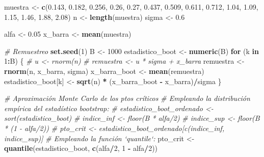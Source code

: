\documentclass[
]{book}
\newenvironment{Shaded}{\begin{snugshade}}{\end{snugshade}}
\newcommand{\CommentTok}[1]{\textcolor[rgb]{0.56,0.35,0.01}{\textit{#1}}}
\newcommand{\ControlFlowTok}[1]{\textcolor[rgb]{0.13,0.29,0.53}{\textbf{#1}}}
\newcommand{\DecValTok}[1]{\textcolor[rgb]{0.00,0.00,0.81}{#1}}
\newcommand{\FloatTok}[1]{\textcolor[rgb]{0.00,0.00,0.81}{#1}}
\newcommand{\KeywordTok}[1]{\textcolor[rgb]{0.13,0.29,0.53}{\textbf{#1}}}
\newcommand{\NormalTok}[1]{#1}
\newcommand{\OperatorTok}[1]{\textcolor[rgb]{0.81,0.36,0.00}{\textbf{#1}}}
\newcommand{\StringTok}[1]{\textcolor[rgb]{0.31,0.60,0.02}{#1}}
\theoremstyle{break}
\theoremstyle{definition}
\theoremstyle{definition}
\theoremstyle{definition}
\theoremstyle{remark}
\begin{document}
\begin{Shaded}
\begin{Highlighting}[]
\NormalTok{muestra <-}\StringTok{ }\KeywordTok{c}\NormalTok{(}\FloatTok{0.143}\NormalTok{, }\FloatTok{0.182}\NormalTok{, }\FloatTok{0.256}\NormalTok{, }\FloatTok{0.26}\NormalTok{, }\FloatTok{0.27}\NormalTok{, }\FloatTok{0.437}\NormalTok{, }\FloatTok{0.509}\NormalTok{, }
             \FloatTok{0.611}\NormalTok{, }\FloatTok{0.712}\NormalTok{, }\FloatTok{1.04}\NormalTok{, }\FloatTok{1.09}\NormalTok{, }\FloatTok{1.15}\NormalTok{, }\FloatTok{1.46}\NormalTok{, }\FloatTok{1.88}\NormalTok{, }\FloatTok{2.08}\NormalTok{)}
\NormalTok{n <-}\StringTok{ }\KeywordTok{length}\NormalTok{(muestra)}
\NormalTok{sigma <-}\StringTok{ }\FloatTok{0.6}

\NormalTok{alfa <-}\StringTok{ }\FloatTok{0.05}
\NormalTok{x_barra <-}\StringTok{ }\KeywordTok{mean}\NormalTok{(muestra)}

\CommentTok{# Remuestreo}
\KeywordTok{set.seed}\NormalTok{(}\DecValTok{1}\NormalTok{)}
\NormalTok{B <-}\StringTok{ }\DecValTok{1000}
\NormalTok{estadistico_boot <-}\StringTok{ }\KeywordTok{numeric}\NormalTok{(B)}
\ControlFlowTok{for}\NormalTok{ (k }\ControlFlowTok{in} \DecValTok{1}\OperatorTok{:}\NormalTok{B) \{}
    \CommentTok{# u <- rnorm(n)}
    \CommentTok{# remuestra <- u * sigma + x_barra}
\NormalTok{    remuestra <-}\StringTok{ }\KeywordTok{rnorm}\NormalTok{(n, x_barra, sigma)}
\NormalTok{    x_barra_boot <-}\StringTok{ }\KeywordTok{mean}\NormalTok{(remuestra)}
\NormalTok{    estadistico_boot[k] <-}\StringTok{ }\KeywordTok{sqrt}\NormalTok{(n) }\OperatorTok{*}\StringTok{ }\NormalTok{(x_barra_boot }\OperatorTok{-}\StringTok{ }\NormalTok{x_barra)}\OperatorTok{/}\NormalTok{sigma}
\NormalTok{\}}

\CommentTok{# Aproximación Monte Carlo de los ptos críticos}
\CommentTok{# Empleando la distribución empírica del estadístico bootstrap: }
    \CommentTok{# estadistico_boot_ordenado <- sort(estadistico_boot)}
    \CommentTok{# indice_inf <- floor(B * alfa/2)}
    \CommentTok{# indice_sup <- floor(B * (1 - alfa/2))}
    \CommentTok{# pto_crit <- estadistico_boot_ordenado[c(indice_inf, indice_sup)]}
\CommentTok{# Empleando la función `quantile`:}
\NormalTok{pto_crit <-}\StringTok{ }\KeywordTok{quantile}\NormalTok{(estadistico_boot, }\KeywordTok{c}\NormalTok{(alfa}\OperatorTok{/}\DecValTok{2}\NormalTok{, }\DecValTok{1} \OperatorTok{-}\StringTok{ }\NormalTok{alfa}\OperatorTok{/}\DecValTok{2}\NormalTok{))}


\end{Highlighting}
\end{Shaded}
\end{document}
